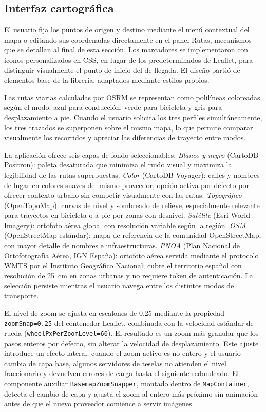 \subsection{Interfaz cartográfica}
\label{subsec:impl_frontend_mapa}

El usuario fija los puntos de origen y destino mediante el menú contextual del mapa o editando sus coordenadas directamente en el panel Rutas, mecanismos que se detallan al final de esta sección. Los marcadores se implementaron con iconos personalizados en CSS, en lugar de los predeterminados de Leaflet, para distinguir visualmente el punto de inicio del de llegada. El diseño partió de elementos base de la librería, adaptados mediante estilos propios.

Las rutas viarias calculadas por OSRM se representan como polilíneas coloreadas según el modo: azul para conducción, verde para bicicleta y gris para desplazamiento a pie. Cuando el usuario solicita los tres perfiles simultáneamente, los tres trazados se superponen sobre el mismo mapa, lo que permite comparar visualmente los recorridos y apreciar las diferencias de trayecto entre modos.

La aplicación ofrece seis capas de fondo seleccionables. \textit{Blanco y negro} (CartoDB Positron): paleta desaturada que minimiza el ruido visual y maximiza la legibilidad de las rutas superpuestas. \textit{Color} (CartoDB Voyager): calles y nombres de lugar en colores suaves del mismo proveedor, opción activa por defecto por ofrecer contexto urbano sin competir visualmente con las rutas. \textit{Topográfico} (OpenTopoMap): curvas de nivel y sombreado de relieve, especialmente relevante para trayectos en bicicleta o a pie por zonas con desnivel. \textit{Satélite} (Esri World Imagery): ortofoto aérea global con resolución variable según la región. \textit{OSM} (OpenStreetMap estándar): mapa de referencia de la comunidad OpenStreetMap, con mayor detalle de nombres e infraestructuras. \textit{PNOA} (Plan Nacional de Ortofotografía Aérea, IGN España): ortofoto aérea servida mediante el protocolo WMTS por el Instituto Geográfico Nacional; cubre el territorio español con resolución de 25~cm en zonas urbanas y no requiere token de autenticación. La selección persiste mientras el usuario navega entre los distintos modos de transporte.

El nivel de zoom se ajusta en escalones de 0,25 mediante la propiedad \texttt{zoomSnap=0.25} del contenedor Leaflet, combinada con la velocidad estándar de rueda (\texttt{wheelPxPerZoomLevel=60}). El resultado es un zoom más granular que los pasos enteros por defecto, sin alterar la velocidad de desplazamiento. Este ajuste introduce un efecto lateral: cuando el zoom activo es no entero y el usuario cambia de capa base, algunos servidores de teselas no atienden el nivel fraccionario y devuelven errores de carga hasta el siguiente redondeado. El componente auxiliar \texttt{BasemapZoomSnapper}, montado dentro de \texttt{MapContainer}, detecta el cambio de capa y ajusta el zoom al entero más próximo sin animación antes de que el nuevo proveedor comience a servir imágenes.

